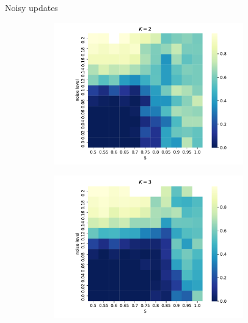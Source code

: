 \documentclass[11pt]{beamer}
\begin{document}
\begin{frame}{Noisy updates}
  \begin{figure}[t!]
    \centering
        \begin{subfigure}[t]{0.49\textwidth}
            \centering
            \includegraphics[width=0.9\textwidth]{Figures/p_v_noise_k=2.pdf}
        \end{subfigure}
        \begin{subfigure}[t]{0.49\textwidth}
            \centering
            \includegraphics[width=0.9\textwidth]{Figures/p_v_noise_k=3.pdf}
        \end{subfigure} \\
    \begin{subfigure}[t]{0.49\textwidth}
        \centering

\end{subfigure}
\end{figure}
\end{frame}
\end{document}
